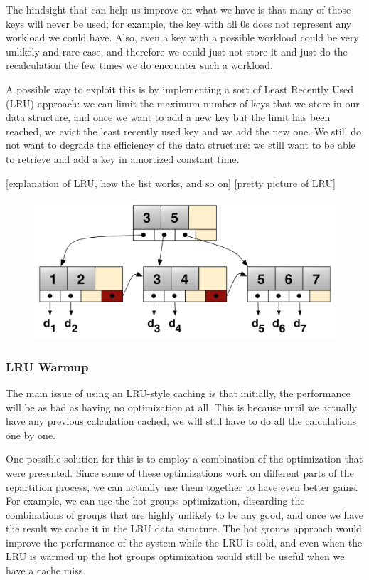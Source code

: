 The hindsight that can help us improve on what we have is that many of those keys will never be used; for example, the key with all 0s does not represent any workload we could have. Also, even a key with a possible workload could be very unlikely and rare case, and therefore we could just not store it and just do the recalculation the few times we do encounter such a workload. 

A possible way to exploit this is by implementing a sort of Least Recently Used (LRU) approach: we can limit the maximum number of keys that we store in our data structure, and once we want to add a new key but the limit has been reached, we evict the least recently used key and we add the new one. We still do not want to degrade the efficiency of the data structure: we still want to be able to retrieve and add a key in amortized constant time.

[explanation of LRU, how the list works, and so on]
[pretty picture of LRU]
\begin{figure}[!htb]
  \centering
  \includegraphics[width=\textwidth,height=\textheight,keepaspectratio]{img/b+tree.png}
  \caption[caption]{ }
  \label{fig:b+tree}
\end{figure}

\subsubsection{LRU Warmup}\label{sec:warmup}
The main issue of using an LRU-style caching is that initially, the performance will be as bad as having no optimization at all. This is because until we actually have any previous calculation cached, we will still have to do all the calculations one by one. 

One possible solution for this is to employ a combination of the optimization that were presented. Since some of these optimizations work on different parts of the repartition process, we can actually use them together to have even better gains. For example, we can use the hot groups optimization, discarding the combinations of groups that are highly unlikely to be any good, and once we have the result we cache it in the LRU data structure. The hot groups approach would improve the performance of the system while the LRU is cold, and even when the LRU is warmed up the hot groups optimization would still be useful when we have a cache miss.

